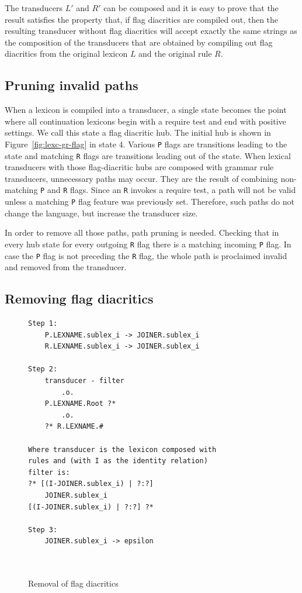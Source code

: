 \documentclass[10pt, a4paper]{article}
\begin{document}
The transducers $L'$ and $R'$ can be composed and it is easy to
prove that the result satisfies the property that, if flag diacritics
are compiled out, then the resulting transducer without flag
diacritics will accept exactly the same strings as the composition of
the transducers that are obtained by compiling out flag diacritics
from the original lexicon $L$ and the original rule $R$.



\subsection{Pruning invalid paths}

When a lexicon is compiled into a transducer, a single state becomes the point where all continuation lexicons begin with a require test and end with positive settings. We call this state a flag diacritic hub. The initial hub is shown in
Figure~\ref{fig:lexc-gr-flag} in state 4. Various \verb+P+ flags are transitions leading to the state and matching \verb+R+ flags are transitions leading out of the state. 
When lexical transducers with those flag-diacritic hubs are composed with grammar rule transducers, unnecessary paths may occur. 
They are the result of combining non-matching \verb+P+ and \verb+R+ flags. Since an \verb+R+ invokes a require test, 
a path will not be valid unless a matching \verb+P+ flag feature was previously set. 
Therefore, such paths do not change the language, but increase the transducer size.

In order to remove all those paths, path pruning is needed. Checking that in every hub state for every outgoing 
\verb+R+ flag there is a matching incoming \verb+P+ flag. In case the \verb+P+ flag is not preceding the \verb+R+ flag, 
the whole path is proclaimed invalid and removed from the transducer.





		

\subsection{Removing flag diacritics}


\begin{figure}
\centering
\begin{verbatim}
Step 1:
    P.LEXNAME.sublex_i -> JOINER.sublex_i
    R.LEXNAME.sublex_i -> JOINER.sublex_i
    
Step 2:
    transducer - filter
        .o.
    P.LEXNAME.Root ?*
        .o.
    ?* R.LEXNAME.#
  
Where transducer is the lexicon composed with
rules and (with I as the identity relation)
filter is:
?* [(I-JOINER.sublex_i) | ?:?]
    JOINER.sublex_i 
[(I-JOINER.sublex_i) | ?:?] ?*

Step 3:
    JOINER.sublex_i -> epsilon

  
    \end{verbatim}
    \caption{Removal of flag diacritics
    \label{fig:lexc-remov}}
\end{figure}
\end{document}
